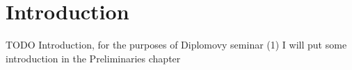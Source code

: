 \chapter*{Introduction}

TODO Introduction, for the purposes of Diplomovy seminar (1) I will put some 
introduction in the Preliminaries chapter
